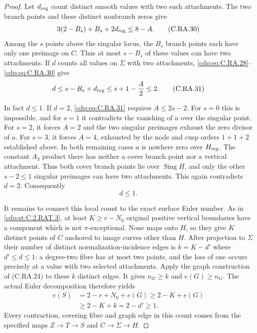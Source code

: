 \begin{proof}
Let $d_{\rm reg}$ count distinct smooth values with
two such attachments. The two branch points and these
distinct nonbranch zeros give
\[
             3(2-B_s)+B_s+2d_{\rm reg}\le8-A.
\tag{C.RA.30}\label{cdp:eq:C.RA.30}
\]
Among the $s$ points above the singular locus, the
$B_s$ branch points each have only one preimage on
$C$. Thus at most $s-B_s$ of these values can have
two attachments. If $d$ counts all values on
$\Sigma$ with two attachments, \eqref{cdp:eq:C.RA.28}--\eqref{cdp:eq:C.RA.30}
give
\[
 d\le s-B_s+d_{\rm reg}
       \le s+1-\frac A2\le2.
\tag{C.RA.31}\label{cdp:eq:C.RA.31}
\]

In fact $d\le1$. If $d=2$, \eqref{cdp:eq:C.RA.31} requires
$A\le2s-2$. For $s=0$ this is impossible, and for
$s=1$ it contradicts the vanishing of $a$ over the
singular point. For $s=2$, it forces $A=2$ and
the two singular preimages exhaust the zero divisor
of $a$. For $s=3$, it forces $A=4$, exhausted by
the node and cusp orders $1+1+2$ established above.
In both remaining cases $a$ is nowhere zero over
$H_{\rm reg}$. The constant $A_3$ product there
has neither a cover branch point nor a vertical
attachment. Thus both cover branch points lie
over $\operatorname{Sing}H$, and only the other
$s-2\le1$ singular preimages can have two
attachments. This again contradicts $d=2$.
Consequently
\[
                            d\le1.
\tag{C.RA.31a}\label{cdp:eq:C.RA.31a}
\]

It remains to connect this local count to the exact
surface Euler number. As in \ref{cdp:st:C.2.RAT.3}, at least
$K\ge r-N_0$ original positive vertical boundaries
have a component which is not $\pi$-exceptional.
None maps onto $H$, so they give $K$ distinct points
of $C$ anchored to image curves other than $H$.
After projection to $\Sigma$ their number of distinct
normalization-incidence edges is $k=K-d'$ where
$d'\le d\le1$: a degree-two fibre has at most two
points, and the loss of one occurs precisely at a
value with two selected attachments. Apply the graph
construction of (C.RA.24) to these $k$ distinct
edges. It gives $n_G\ge k$ and $e(G)\ge n_G$.
The actual Euler decomposition therefore yields
\[
\begin{split}
 e(S)&=2-r+N_0+e(G)
       \ge2-K+e(G)\\
     &\ge2-K+k=2-d'\ge1.
\end{split}
\tag{C.RA.32}\label{cdp:eq:C.RA.32}
\]
Every contraction, covering fibre and graph edge in
this count comes from the specified maps
$Z\to T\to S$ and $C\to\Sigma\to H$.
\end{proof}


